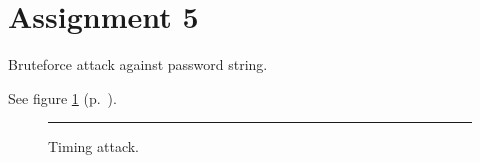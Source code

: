 \section*{Assignment 5}

Bruteforce attack against password string.

See figure \ref{fig:as5-schematic} (p.~\pageref{fig:as5-schematic}).

\begin{figure}[tb]
    \begin{center}
        
        \caption{Timing attack.}
        \label{fig:as5-schematic}
        \vspace{1em}\hrule
    \end{center}
\end{figure}
